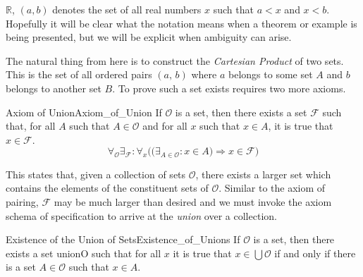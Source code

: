         $\mathbb{R}$, $(a,b)$ denotes the set of all real numbers $x$ such that
        $a<x$ and $x<b$. Hopefully it will be clear what the notation means when
        a theorem or example is being presented, but we will be explicit when
        ambiguity can arise.
        \par\hfill\par
        The natural thing from here is to construct the
        \textit{Cartesian Product} of two sets. This is
        the set of all ordered pairs $(a,\,b)$ where $a$
        belongs to some set $A$ and $b$ belongs to another set $B$. To prove
        such a set exists requires two more axioms.
        \newpage
        \begin{faxiom}{Axiom of Union}{Axiom_of_Union}
            If $\mathcal{O}$ is a set, then there exists a set $\mathcal{F}$
            such that, for all $A$ such that $A\in\mathcal{O}$ and for all
            $x$ such that $x\in{A}$, it is true that $x\in\mathcal{F}$.%
            \begin{equation*}
                \forall_{\mathcal{O}}\exists_{\mathcal{F}}:\forall_{x}\Big(
                \big(\exists_{A\in\mathcal{O}}:x\in{A}\big)
                \Rightarrow{x}\in\mathcal{F}\Big)
            \end{equation*}
        \end{faxiom}
        This states that, given a collection of sets $\mathcal{O}$, there exists
        a larger set which contains the elements of the constituent sets of
        $\mathcal{O}$. Similar to the axiom of pairing, $\mathcal{F}$ may be
        much larger than desired and we must invoke the axiom schema of
        specification to arrive at the \textit{union} over a collection.
        \begin{ltheorem}{Existence of the Union of Sets}{Existence_of_Unions}
            If $\mathcal{O}$ is a set, then there exists a set \gls{unionO} such
            that for all $x$ it is true that $x\in\bigcup\mathcal{O}$ if and
            only if there is a set $A\in\mathcal{O}$ such that $x\in{A}$.
        \end{ltheorem}
